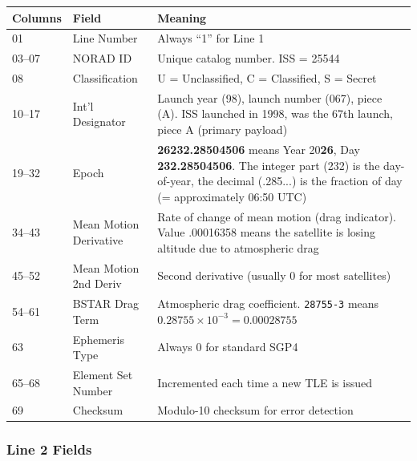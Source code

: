 \documentclass[12pt,a4paper]{article}
\begin{document}
\begin{longtable}{p{2.5cm} p{3cm} p{7.5cm}}
\toprule
\textbf{Columns} & \textbf{Field} & \textbf{Meaning} \\
\midrule
\endhead
01 & Line Number & Always ``1'' for Line 1 \\
03--07 & NORAD ID & Unique catalog number. ISS = 25544 \\
08 & Classification & U = Unclassified, C = Classified, S = Secret \\
10--17 & Int'l Designator & Launch year (98), launch number (067), piece (A). ISS launched in 1998, was the 67th launch, piece A (primary payload) \\
19--32 & Epoch & \textbf{26232.28504506} means Year 20\textbf{26}, Day \textbf{232.28504506}. The integer part (232) is the day-of-year, the decimal (.285...) is the fraction of day (= approximately 06:50 UTC) \\
34--43 & Mean Motion Derivative & Rate of change of mean motion (drag indicator). Value .00016358 means the satellite is losing altitude due to atmospheric drag \\
45--52 & Mean Motion 2nd Deriv & Second derivative (usually 0 for most satellites) \\
54--61 & BSTAR Drag Term & Atmospheric drag coefficient. \texttt{28755-3} means $0.28755 \times 10^{-3} = 0.00028755$ \\
63 & Ephemeris Type & Always 0 for standard SGP4 \\
65--68 & Element Set Number & Incremented each time a new TLE is issued \\
69 & Checksum & Modulo-10 checksum for error detection \\
\bottomrule
\end{longtable}

\subsubsection{Line 2 Fields}
\end{document}
